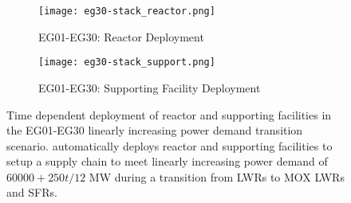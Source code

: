 \begin{figure}[]
	\centering
	\begin{subfigure}[t]{1\textwidth}
		\centering
		\texttt{[image: eg30-stack\_reactor.png]} 
		\caption{EG01-EG30: Reactor Deployment}
		\label{fig:30reactor}
	\end{subfigure}
	\begin{subfigure}[t]{1\textwidth}
		\centering
		\texttt{[image: eg30-stack\_support.png]} 
		\caption{EG01-EG30: Supporting Facility Deployment}
		\label{fig:30support}
	\end{subfigure}
	\hfill
	\caption{Time dependent deployment of reactor and supporting facilities in 
	the EG01-EG30 linearly increasing power demand transition scenario. 
	\deploy automatically deploys reactor and supporting facilities 
	to setup a supply chain to meet linearly increasing power demand of $60000 + 250t/12$ MW
	during a transition from \glspl{LWR} to MOX LWRs and \glspl{SFR}. }
	\label{fig:30stack}
\end{figure}
